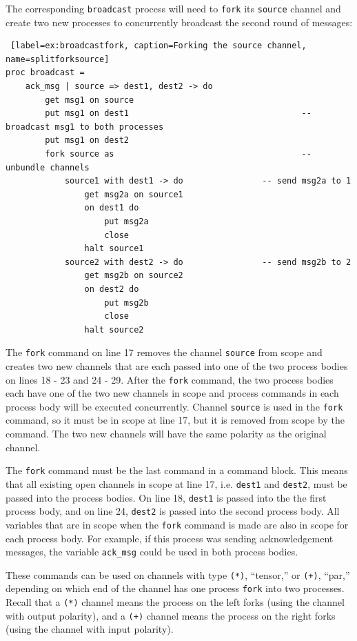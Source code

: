 \documentclass[acmsmall]{acmart}
\begin{document}
The corresponding \lstinline$broadcast$ process will need to \lstinline$fork$ its \lstinline$source$ channel and create two new processes to concurrently broadcast the second round of messages:
\begin{lstlisting} [label=ex:broadcastfork, caption=Forking the source channel, name=splitforksource] 
proc broadcast = 
	ack_msg | source => dest1, dest2 -> do
		get msg1 on source				
		put msg1 on dest1									-- broadcast msg1 to both processes
		put msg1 on dest2
		fork source as										-- unbundle channels
			source1 with dest1 -> do				-- send msg2a to 1
				get msg2a on source1
				on dest1 do
					put msg2a
					close
				halt source1
			source2 with dest2 -> do				-- send msg2b to 2
				get msg2b on source2
				on dest2 do
					put msg2b
					close
				halt source2
\end{lstlisting} 
The \lstinline$fork$ command on line 17 removes the channel \lstinline$source$ from scope and creates two new channels that are each passed into one of the two process bodies on lines 18 - 23 and 24 - 29.
After the \lstinline$fork$ command, the two process bodies each have one of the two new channels in scope and process commands in each process body will be executed concurrently.
Channel \lstinline$source$ is used in the \lstinline$fork$ command, so it must be in scope at line 17, but it is removed from scope by the command.
The two new channels will have the same polarity as the original channel.

The \lstinline$fork$ command must be the last command in a command block. 
This means that all existing open channels in scope at line 17, i.e. \lstinline$dest1$ and \lstinline$dest2$, must be passed into the process bodies.
On line 18, \lstinline$dest1$ is passed into the the first process body, and on line 24, \lstinline$dest2$ is passed into the second process body.
All variables that are in scope when the \lstinline$fork$ command is made are also in scope for each process body.
For example, if this process was sending acknowledgement messages, the variable \lstinline$ack_msg$ could be used in both process bodies.

These commands can be used on channels with type \lstinline$(*)$, ``tensor,'' or \lstinline$(+)$, ``par,'' depending on which end of the channel has one process \lstinline$fork$ into two processes.
Recall that a \lstinline$(*)$ channel means the process on the left forks (using the channel with output polarity), and a \lstinline$(+)$ channel means the process on the right forks (using the channel with input polarity).
\end{document}
